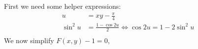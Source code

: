 First we need some helper expressions:
\begin{align}
  u &= xy-\frac{\pi}{4} \label{eq.u}\\
  \sin^2{u} &= \frac{1-\cos{2u}}{2}
      \iff \cos{2u} = 1 - 2\sin^2{u} \label{eq.cos2u} \\
\end{align}
We now simplify $F(x,y)-1 = 0$,
\begin{align*}
\end{align*}
